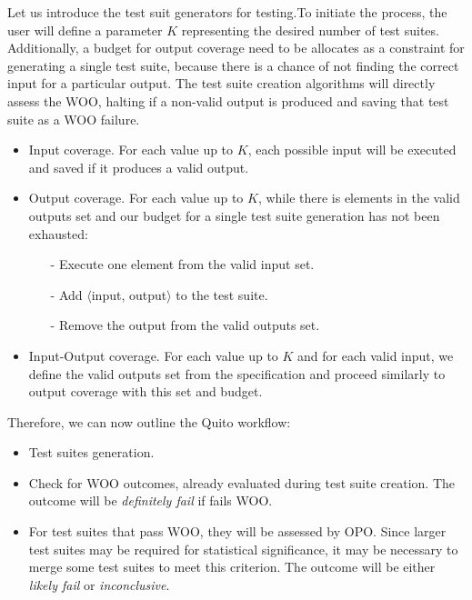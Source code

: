 \begin{itemize}
Let us introduce the test suit generators for testing.To initiate the process, the user will define a parameter $K$ representing the desired number of test suites. Additionally, a budget for output coverage need to be allocates as a constraint for generating a single test suite, because there is a chance of not finding the correct input for a particular output. The test suite creation algorithms will directly assess the WOO, halting if a non-valid output is produced and saving that test suite as a WOO failure.

\vspace{-3pt}
\begin{itemize}
    \item Input coverage. For each value up to $K$, each possible input will be executed and saved if it produces a valid output.
    \item Output coverage. For each value up to $K$, while there is elements in the valid outputs set and our budget for a single test suite generation has not been exhausted:
    \begin{itemize}
        \item[-] Execute one element from the valid input set.
        \item[-] Add $\langle$input, output$\rangle$ to the test suite.
        \item[-] Remove the output from the valid outputs set.
    \end{itemize}
    \item Input-Output coverage. For each value up to $K$ and for each valid input, we define the valid outputs set from the specification and proceed similarly to output coverage with this set and budget.
\end{itemize}

Therefore, we can now outline the Quito workflow:
\begin{itemize}
    \item Test suites generation.
    \item Check for WOO outcomes, already evaluated during test suite creation. The outcome will be \textit{definitely fail} if fails WOO.
    \item For test suites that pass WOO, they will be assessed by OPO. Since larger test suites may be required for statistical significance, it may be necessary to merge some test suites to meet this criterion. The outcome will be either \textit{likely fail} or \textit{inconclusive}.
\end{itemize}


\end{itemize}
